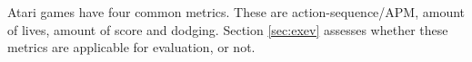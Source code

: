 Atari games have four common metrics. These are action-sequence/APM, amount of lives, amount of score and dodging. Section \ref{sec:exev} assesses whether these metrics are applicable for evaluation, or not.









